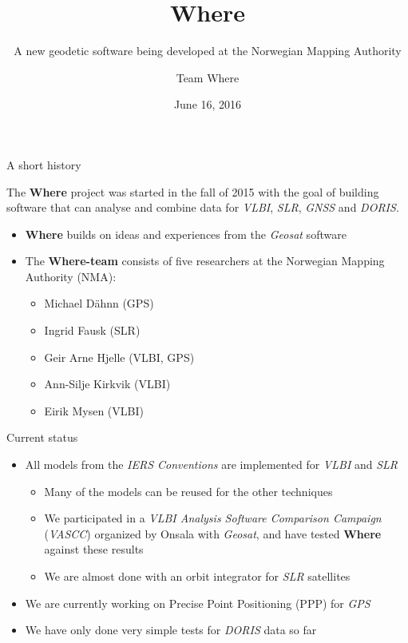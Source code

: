 \documentclass[ignorenonframetext,12pt,t]{beamer}
\title{Where}
\subtitle{A new geodetic software being developed at the Norwegian Mapping
Authority}
\author{Team Where}
\date{June 16, 2016}
\providecommand{\tightlist}{%
  \setlength{\itemsep}{0pt}\setlength{\parskip}{0pt}}
\begin{document}
\frame{\titlepage}

\begin{frame}{A short history}

The \textbf{Where} project was started in the fall of 2015 with the goal
of building software that can analyse and combine data for \emph{VLBI},
\emph{SLR}, \emph{GNSS} and \emph{DORIS}.

\begin{itemize}
\item
  \textbf{Where} builds on ideas and experiences from the \emph{Geosat}
  software
\item
  The \textbf{Where-team} consists of five researchers at the Norwegian
  Mapping Authority (NMA):

  \begin{itemize}
  \tightlist
  \item
    Michael Dähnn (GPS)
  \item
    Ingrid Fausk (SLR)
  \item
    Geir Arne Hjelle (VLBI, GPS)
  \item
    Ann-Silje Kirkvik (VLBI)
  \item
    Eirik Mysen (VLBI)
  \end{itemize}
\end{itemize}

\end{frame}

\begin{frame}{Current status}

\begin{itemize}
\item
  All models from the \emph{IERS Conventions} are implemented for
  \emph{VLBI} and \emph{SLR}

  \begin{itemize}
  \item
    Many of the models can be reused for the other techniques
  \item
    We participated in a \emph{VLBI Analysis Software Comparison
    Campaign} (\emph{VASCC}) organized by Onsala with \emph{Geosat}, and
    have tested \textbf{Where} against these results
  \item
    We are almost done with an orbit integrator for \emph{SLR}
    satellites
  \end{itemize}
\item
  We are currently working on Precise Point Positioning (PPP) for
  \emph{GPS}
\item
  We have only done very simple tests for \emph{DORIS} data so far
\end{itemize}

\end{frame}
\end{document}
